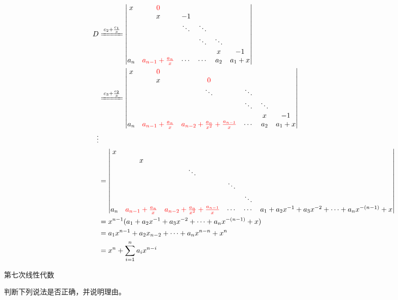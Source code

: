\documentclass[a4paper]{report}
\begin{document}
\begin{jie}
\begin{align*}
D&\xlongequal{c_2+\frac{c_1}{x}}
\begin{vmatrix}
x&\textcolor[rgb]{1.00,0.00,0.00}{0}\\
&x&-1\\
&&\ddots&\ddots\\
&&&\ddots&\ddots\\
&&&&x&-1\\
a_{n}&\textcolor[rgb]{1.00,0.00,0.00}{a_{n-1}+\frac{a_n}{x}}&\cdots&\cdots&a_2&a_1+x
\end{vmatrix}\\ &\xlongequal{c_3+\frac{c_2}{x}}
\begin{vmatrix}
x&\textcolor[rgb]{1.00,0.00,0.00}{0}\\
&x&\textcolor[rgb]{1.00,0.00,0.00}{0}\\
&&\ddots&\ddots\\
&&&\ddots&\ddots\\
&&&&x&-1\\
a_{n}&\textcolor[rgb]{1.00,0.00,0.00}{a_{n-1}+\frac{a_n}{x}}&\textcolor[rgb]{1.00,0.00,0.00}{a_{n-2}+\frac{a_n}{x^2}+\frac{a_{n-1}}{x}}&\cdots&a_2&a_1+x
\end{vmatrix}
\\
\hphantom{~~~~~~~~~~~~~~~~~~}\vdots
\\
&=\begin{vmatrix}
x\\
&x\\
&&\ddots\\
&&&\ddots\\
&&&&\ddots&\\
a_{n}&\textcolor[rgb]{1.00,0.00,0.00}{a_{n-1}+\frac{a_n}{x}}&\textcolor[rgb]{1.00,0.00,0.00}{a_{n-2}+\frac{a_n}{x^2}+\frac{a_{n-1}}{x}}&\cdots&\cdots&a_1+a_2x^{-1}+a_{3}x^{-2}+\cdots+a_nx^{-(n-1)}+x
\end{vmatrix}
\\
&=x^{n-1}(a_1+a_2x^{-1}+a_{3}x^{-2}+\cdots+a_nx^{-(n-1)}+x)\\
&=a_1x^{n-1}+a_2x_{n-2}+\cdots+a_nx^{n-n}+x^{n}\\
&=x^{n}+\sum_{i=1}^{n}a_ix^{n-i}
\end{align*}
\end{jie}
\clearpage

\hphantom{~~}\hfill {\heiti 第七次线性代数} \hfill\hphantom{~~}

\hphantom{~~}

\EX 判断下列说法是否正确，并说明理由。
\end{document}
